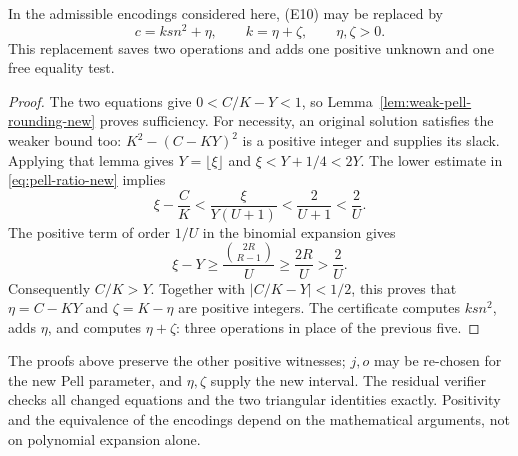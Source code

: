 \begin{proposition}\label{prop:linear-pell-interval-new}\label{lem:linear-ratio}
In the admissible encodings considered here, (E10) may be replaced by
\begin{equation}\label{eq:linear-pell-interval-new}
 c=ksn^2+\eta,\qquad k=\eta+\zeta,
 \qquad \eta,\zeta>0.
\end{equation}
This replacement saves two operations and adds one positive unknown
and one free equality test.
\end{proposition}
\begin{proof}
The two equations give $0<C/K-Y<1$, so Lemma~\ref{lem:weak-pell-rounding-new}
proves sufficiency. For necessity, an original solution satisfies the
weaker bound too: $K^2-(C-KY)^2$ is a positive integer and supplies its
slack. Applying that lemma gives
$Y=\lfloor\xi\rfloor$ and $\xi<Y+1/4<2Y$. The lower estimate in
\eqref{eq:pell-ratio-new} implies
\[
 \xi-\frac CK<\frac{\xi}{Y(U+1)}<\frac2{U+1}<\frac2U.
\]
The positive term of order $1/U$ in the binomial expansion gives
\[
 \xi-Y\ge\frac{\binom{2R}{R-1}}{U}
 \ge\frac{2R}{U}>\frac2U.
\]
Consequently $C/K>Y$. Together with $|C/K-Y|<1/2$, this proves that
$\eta=C-KY$ and $\zeta=K-\eta$ are positive integers.
The certificate computes $ksn^2$, adds $\eta$, and computes
$\eta+\zeta$: three operations in place of the previous five.
\end{proof}

The proofs above preserve the other positive witnesses; $j,o$ may be
re-chosen for the new Pell parameter, and $\eta,\zeta$ supply the new
interval. The residual verifier checks all changed equations and the
two triangular identities exactly. Positivity and the equivalence of
the encodings depend on the mathematical arguments, not on polynomial
expansion alone.
